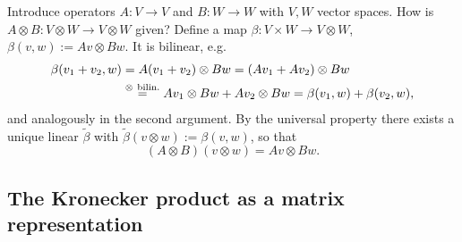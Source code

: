 \documentclass[../../main.tex]{subfiles}
\begin{document}
Introduce operators $A\colon V\to V$ and $B\colon W\to W$ with $V,W$ vector spaces. How is
$A\otimes B\colon V\otimes W\to V\otimes W$ given? Define a map
$\beta\colon V\times W\to V\otimes W$, $\beta(v,w):=Av\otimes Bw$. It is bilinear, e.g.
\begin{align}
\beta(v_1+v_2,w)
&=A(v_1+v_2)\otimes Bw=(Av_1+Av_2)\otimes Bw\notag\\
&\overset{\otimes\ \mathrm{bilin.}}{=}Av_1\otimes Bw+Av_2\otimes Bw
=\beta(v_1,w)+\beta(v_2,w),
\end{align}
and analogously in the second argument. By the universal property there exists a unique
linear $\tilde\beta$ with $\tilde\beta(v\otimes w):=\beta(v,w)$, so that
\begin{equation}
(A\otimes B)(v\otimes w)=Av\otimes Bw .
\end{equation}

\subsection{The Kronecker product as a matrix representation}
\end{document}
